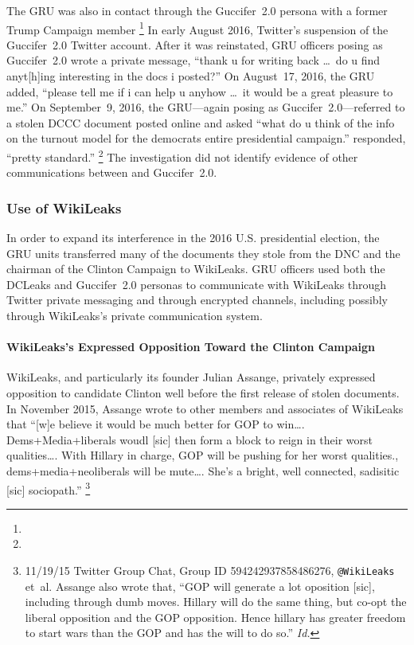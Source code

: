The GRU was also in contact through the Guccifer~2.0 persona with  a former Trump Campaign member %
\footnote{}
In early August 2016,  Twitter's suspension of the Guccifer~2.0 Twitter account.
After it was reinstated, GRU officers posing as Guccifer~2.0 wrote  a private message, ``thank u for writing back \dots\ do u find anyt[h]ing interesting in the docs i posted?''
On August~17, 2016, the GRU added, ``please tell me if i can help u anyhow \dots\ it would be a great pleasure to me.''
On September~9, 2016, the GRU---again posing as Guccifer~2.0---referred to a stolen DCCC document posted online and asked  ``what do u think of the info on the turnout model for the democrats entire presidential campaign.''
 responded, ``pretty standard.''%
\footnote{}
The investigation did not identify evidence of other communications between  and Guccifer~2.0.

\subsubsection{Use of WikiLeaks}

In order to expand its interference in the 2016 U.S. presidential election, the GRU units transferred many of the documents they stole from the DNC and the chairman of the Clinton Campaign to WikiLeaks.
GRU officers used both the DCLeaks and Guccifer~2.0 personas to communicate with WikiLeaks through Twitter private messaging and through encrypted channels, including possibly through WikiLeaks's private communication system.

\paragraph{WikiLeaks's Expressed Opposition Toward the Clinton Campaign}

WikiLeaks, and particularly its founder Julian Assange, privately expressed opposition to candidate Clinton well before the first release of stolen documents.
In November 2015, Assange wrote to other members and associates of WikiLeaks that ``[w]e believe it would be much better for GOP to win\dots.
Dems+Media+liberals woudl [sic] then form a block to reign in their worst qualities\dots.
With Hillary in charge, GOP will be pushing for her worst qualities., dems+media+neoliberals will be mute\dots.
She's a bright, well connected, sadisitic [sic] sociopath.''%
\footnote{11/19/15 Twitter Group Chat, Group ID 594242937858486276, \verb+@WikiLeaks+ et~al.
Assange also wrote that, ``GOP will generate a lot oposition [sic], including through dumb moves.
Hillary will do the same thing, but co-opt the liberal opposition and the GOP opposition.
Hence hillary has greater freedom to start wars than the GOP and has the will to do so.'' \textit{Id.}}

